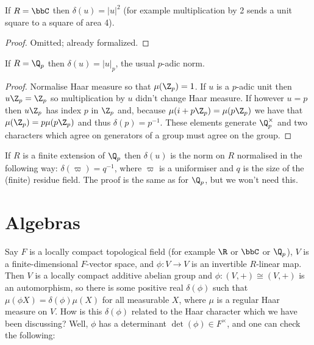 \begin{lemma}
  \label{distribHaarChar_complex}
  \leanok
  If $R=\bbC$ then $\delta(u)=|u|^2$ (for example
multiplication by 2 sends a unit square to a square
of area 4).
\end{lemma}
\begin{proof}
  \leanok
  Omitted; already formalized.
\end{proof}

\begin{lemma}
  \label{distribHaarChar_padic}
  \leanok
  If $R=\Q_p$ then $\delta(u)=|u|_p$, the usual $p$-adic norm.
\end{lemma}
\begin{proof}
  \leanok
  Normalise Haar measure so that $\mu(\Z_p)=1$.
  If $u$ is a $p$-adic unit then $u\Z_p=\Z_p$ so multiplication by $u$ didn't change
  Haar measure. If however $u=p$ then $u\Z_p$ has index $p$ in $\Z_p$ and, because
  $\mu(i+p\Z_p)=\mu(p\Z_p)$ we have that $\mu(\Z_p)=p\mu(p\Z_p)$ and thus $\delta(p)=p^{-1}$.
  These elements generate $\Q_p^\times$ and two characters which agree on generators
  of a group must agree on the group.
\end{proof}

\begin{remark}

If $R$ is a finite extension of $\Q_p$ then $\delta(u)$
is the norm on $R$ normalised in the following way:
$\delta(\varpi)=q^{-1}$, where $\varpi$ is a uniformiser
and $q$ is the size of the (finite) residue field. The proof is
the same as for $\Q_p$, but we won't need this.
\end{remark}

\section{Algebras}

  Say $F$ is a locally compact topological field (for example $\R$ or $\bbC$ or $\Q_p$), $V$
  is a finite-dimensional $F$-vector space, and $\phi:V\to V$ is an invertible $R$-linear map.
  Then $V$ is a locally compact additive abelian group and $\phi:(V,+)\cong(V,+)$ is an automorphism,
  so there is some positive real $\delta(\phi)$ such that $\mu(\phi X)=\delta(\phi)\mu(X)$ for
  all measurable $X$, where $\mu$ is a regular Haar measure on $V$. How is this $\delta(\phi)$ related
  to the Haar character which we have been discussing? Well, $\phi$ has a determinant $\det(\phi)\in F^\times$,
  and one can check the following:

